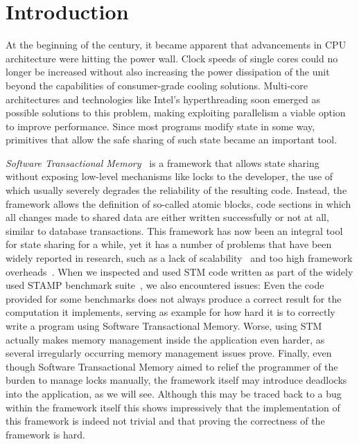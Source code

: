 %
\chapter{Introduction}
\label{sec:introduction}

At the beginning of the century, it became apparent that advancements in CPU architecture were hitting the power wall.
Clock speeds of single cores could no longer be increased without also increasing the power dissipation of the unit beyond the capabilities of consumer-grade cooling solutions.
Multi-core architectures and technologies like Intel's hyperthreading soon emerged as possible solutions to this problem, making exploiting parallelism a viable option to improve performance.
Since most programs modify state in some way, primitives that allow the safe sharing of such state became an important tool.

\emph{Software Transactional Memory}~\cite{shavit1997software} is a framework that allows state sharing without exposing low-level mechanisms like locks to the developer, the use of which usually severely degrades the reliability of the resulting code.
Instead, the framework allows the definition of so-called atomic blocks, code sections in which all changes made to shared data are either written successfully or not at all, similar to database transactions.
This framework has now been an integral tool for state sharing for a while, yet it has a number of problems that have been widely reported in research, such as a lack of scalability~\cite{perfumo2008limits} and too high framework overheads~\cite{cascaval2008software}.
When we inspected and used STM code written as part of the widely used STAMP benchmark suite~\cite{minh2008stamp}, we also encountered issues:
Even the code provided for some benchmarks does not always produce a correct result for the computation it implements, serving as example for how hard it is to correctly write a program using Software Transactional Memory.
Worse, using STM actually makes memory management inside the application even harder, as several irregularly occurring memory management issues prove.
Finally, even though Software Transactional Memory aimed to relief the programmer of the burden to manage locks manually, the framework itself may introduce deadlocks into the application, as we will see.
Although this may be traced back to a bug within the framework itself this shows impressively that the implementation of this framework is indeed not trivial and that proving the correctness of the framework is hard.

